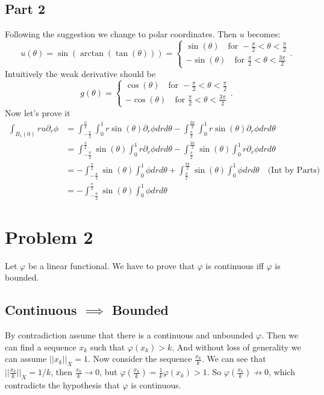 \documentclass{article}
\begin{document}
\subsection*{Part 2}
Following the suggestion we change to polar coordinates.
Then $u$ becomes:
\[
u(\theta)=\sin(\arctan(\tan(\theta)))=\begin{cases}
	\sin(\theta) \quad \text{for } -\frac{\pi}{2} < \theta < \frac{\pi}{2}\\
	-\sin(\theta) \quad \text{for } \frac{\pi}{2} < \theta < \frac{3\pi}{2}
\end{cases}.
\]
Intuitively the weak derivative should be
\[
g(\theta)=\begin{cases}
	\cos(\theta) \quad \text{for } -\frac{\pi}{2} < \theta < \frac{\pi}{2}\\
	-\cos(\theta) \quad \text{for } \frac{\pi}{2} < \theta < \frac{3\pi}{2}
\end{cases}.
\]
Now let's prove it
\begin{align*}
	\int_{B_1(0)}ru\partial_r\phi &=\int_{-\frac{\pi}{2}}^{\frac{\pi}{2}} \int_0^1 r\sin(\theta)\partial_r\phi drd\theta
		      -\int_{\frac{\pi}{2}}^{\frac{3\pi}{2}} \int_0^1 r\sin(\theta)\partial_r\phi drd\theta\\
		      &= \int_{-\frac{\pi}{2}}^{\frac{\pi}{2}}\sin(\theta) \int_0^1 r\partial_r\phi drd\theta
		      - \int_{\frac{\pi}{2}}^{\frac{3\pi}{2}}\sin(\theta) \int_0^1 r\partial_r\phi drd\theta\\
		      &= -\int_{-\frac{\pi}{2}}^{\frac{\pi}{2}}\sin(\theta) \int_0^1 \phi drd\theta
		      + \int_{\frac{\pi}{2}}^{\frac{3\pi}{2}}\sin(\theta) \int_0^1 \phi drd\theta \quad \text{(Int by Parts)}\\
		      &= -\int_{-\frac{\pi}{2}}^{\frac{\pi}{2}}\sin(\theta) \int_0^1 \phi drd\theta
\end{align*}
\section*{Problem 2}
Let $\varphi$ be a linear functional. We have to prove that $\varphi$ is continuous
iff $\varphi$ is bounded.
\subsection*{Continuous $\implies$ Bounded}
By contradiction assume that there is a continuous and unbounded $\varphi$.
Then we can find a sequence $x_k$ such that $\varphi(x_k)>k$. And without loss
of generality we can assume $||x_k||_X=1$. Now consider the sequence
$\frac{x_k}{k}$. We can see that $||\frac{x_k}{k}||_X=1/k$, then $\frac{x_k}{k}
\to 0$, but $\varphi(\frac{x_k}{k})=\frac{1}{k}\varphi(x_k)>1$. So
$\varphi(\frac{x_k}{k}) \not \to 0$, which contradicts the hypothesis that
$\varphi$ is continuous.
\end{document}
